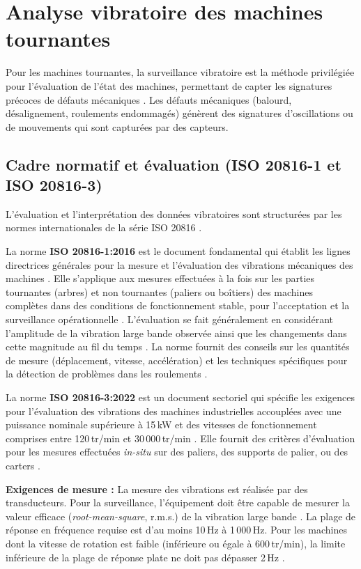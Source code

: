 \section{Analyse vibratoire des machines tournantes}

Pour les machines tournantes, la surveillance vibratoire est la méthode privilégiée pour l'évaluation de l'état des machines, permettant de capter les signatures précoces de défauts mécaniques \cite{iso20816-1,hassan2024,tiboni2022}. Les défauts mécaniques (balourd, désalignement, roulements endommagés) génèrent des signatures d'oscillations ou de mouvements qui sont capturées par des capteurs.

\subsection{Cadre normatif et évaluation (ISO 20816-1 et ISO 20816-3)}

L'évaluation et l'interprétation des données vibratoires sont structurées par les normes internationales de la série ISO 20816 \cite{iso20816-1}.

La norme \textbf{ISO 20816-1:2016} est le document fondamental qui établit les lignes directrices générales pour la mesure et l'évaluation des vibrations mécaniques des machines \cite{iso20816-1}. Elle s'applique aux mesures effectuées à la fois sur les parties tournantes (arbres) et non tournantes (paliers ou boîtiers) des machines complètes dans des conditions de fonctionnement stable, pour l'acceptation et la surveillance opérationnelle \cite{iso20816-1}. L'évaluation se fait généralement en considérant l'amplitude de la vibration large bande observée ainsi que les changements dans cette magnitude au fil du temps \cite{iso20816-1}. La norme fournit des conseils sur les quantités de mesure (déplacement, vitesse, accélération) et les techniques spécifiques pour la détection de problèmes dans les roulements \cite{iso20816-1}.

La norme \textbf{ISO 20816-3:2022} est un document sectoriel qui spécifie les exigences pour l'évaluation des vibrations des machines industrielles accouplées avec une puissance nominale supérieure à 15\,kW et des vitesses de fonctionnement comprises entre 120\,tr/min et 30\,000\,tr/min \cite{iso20816-3}. Elle fournit des critères d'évaluation pour les mesures effectuées \textit{in-situ} sur des paliers, des supports de palier, ou des carters \cite{iso20816-3}.

\textbf{Exigences de mesure :} La mesure des vibrations est réalisée par des transducteurs. Pour la surveillance, l'équipement doit être capable de mesurer la valeur efficace (\textit{root-mean-square}, r.m.s.) de la vibration large bande \cite{iso20816-3}. La plage de réponse en fréquence requise est d'au moins 10\,Hz à 1\,000\,Hz. Pour les machines dont la vitesse de rotation est faible (inférieure ou égale à 600\,tr/min), la limite inférieure de la plage de réponse plate ne doit pas dépasser 2\,Hz \cite{iso20816-3}.

